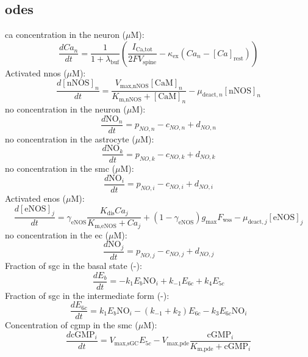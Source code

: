 \documentclass[11pt]{elsarticle}
\newcommand{\uM}{$\mu$M\xspace}
\newcommand{\ca}{\gls{ca}\xspace}
\begin{document}
\subsection{\Glspl{ode}}
%
\ca concentration in the neuron (\uM): 
\begin{equation}       
\dfrac{dCa_n}{dt} = \frac{1}{1 + \lambda_{\text{buf}}}  \left( \frac{I_{\text{Ca,tot}}}{2 F V_{\text{spine}}} - \kappa_{\text{ex}}(Ca_n - [Ca]_{\text{rest}})
\right)
\end{equation}
%
Activated \gls{nnos} (\uM):
\begin{equation}  
\dfrac{d[\text{nNOS}]_n}{dt} = \frac{V_{\text{max,nNOS}} [\text{CaM}]_n}{K_{\text{m,nNOS}}+[\text{CaM}]_n}-\mu_{\text{deact},n} [\text{nNOS}]_n
\end{equation} 
%
\gls{no} concentration in the neuron (\uM):
\begin{equation}  
\dfrac{d\text{NO}_n}{dt} = p_{NO,n} - c_{NO,n} + d_{NO,n}
\end{equation}          	
%
\gls{no} concentration in the astrocyte (\uM):
\begin{equation}  
\dfrac{d\text{NO}_k}{dt} = p_{NO,k} - c_{NO,k} + d_{NO,k}
\end{equation}   
%
\gls{no} concentration in the \gls{smc} (\uM):
\begin{equation}  
\dfrac{d\text{NO}_i}{dt} = p_{NO,i} - c_{NO,i} + d_{NO,i} 
\end{equation}
%
Activated \gls{enos} (\uM):
\begin{equation} 
\dfrac{d[\text{eNOS}]_j}{dt} = \gamma_{\text{eNOS}} \frac{K_{\text{dis}}Ca_j}{K_{\text{m,eNOS}}+Ca_j} + (1-\gamma_{\text{eNOS}}) g_{\max} F_{\text{wss}}   - \mu_{\text{deact},j}[\text{eNOS}]_j
\end{equation}	
%
\gls{no} concentration in the \gls{ec} (\uM):
\begin{equation} 
\dfrac{d\text{NO}_j}{dt} = p_{NO,j} - c_{NO,j} + d_{NO,j} 
\end{equation}
%
Fraction of \gls{sgc} in the basal state (-):%
\begin{equation} 
\dfrac{dE_b}{dt} = -k_1 E_b \text{NO}_i + k_{-1} E_{6c} + k_4 E_{5c}
\end{equation}	
%
Fraction of \gls{sgc} in the intermediate form (-):%
\begin{equation} 
\dfrac{dE_{6c}}{dt} = k_1 E_b \text{NO}_i - (k_{-1} + k_2) E_{6c} - k_3 E_{6c} \text{NO}_i
\end{equation}	
%
Concentration of \gls{cgmp} in the \gls{smc} (\uM):		%
\begin{equation} 
\dfrac{d\text{cGMP}_i}{dt} = V_{\text{max,sGC}} E_{5c} - V_{\text{max,pde}} \frac{\text{cGMP}_i}
{K_{\text{m,pde}} + \text{cGMP}_i}
\end{equation}	
%
\end{document}
